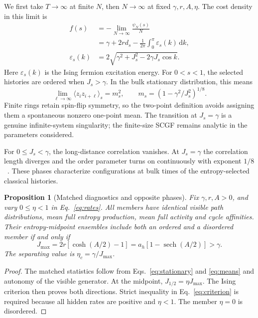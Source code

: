 \documentclass[aps,pre,reprint,amsmath,amssymb,longbibliography,floatfix]{revtex4-2}
\newtheorem{proposition}{Proposition}
\newcommand{\dd}{\,\mathrm d}
\begin{document}
We first take $T\to\infty$ at finite $N$, then $N\to\infty$ at fixed
$\gamma,r,A,\eta$. The cost density in this limit is
\begin{equation}
 \begin{split}
 f(s)&=-\lim_{N\to\infty}\frac{\psi_N(s)}N\\
 &=\gamma+2r d_s-\frac1{2\pi}\int_0^\pi\varepsilon_s(k)\dd k,\\
 \varepsilon_s(k)&=2\sqrt{\gamma^2+J_s^2-2\gamma J_s\cos k}.
 \end{split}
 \label{eq:freeenergy}
\end{equation}
Here $\varepsilon_s(k)$ is the Ising fermion excitation energy.
For $0<s<1$, the selected histories are ordered when $J_s>\gamma$.
In the bulk stationary distribution, this means
\begin{equation}
 \lim_{\ell\to\infty}\langle z_i z_{i+\ell}\rangle_s=m_s^2,
 \qquad m_s=(1-\gamma^2/J_s^2)^{1/8}.
 \label{eq:order}
\end{equation}
Finite rings  retain spin-flip symmetry, so the two-point definition
avoids assigning them a spontaneous nonzero one-point mean.
The transition at $J_s=\gamma$ is a genuine infinite-system singularity;
the finite-size SCGF remains analytic in the parameters considered.

For $0\le J_s<\gamma$, the long-distance correlation vanishes.
At $J_s=\gamma$ the correlation length diverges and the order parameter
turns on continuously with exponent $1/8$~\cite{CriticalPfeuty1970}.
These phases characterize configurations at bulk times of the
entropy-selected classical histories.

\begin{proposition}[Matched diagnostics and opposite phases]
\label{prop:matched}
Fix $\gamma,r,A>0$, and vary $0\leq\eta<1$ in Eq.~\eqref{eq:rates}.
All members have identical visible path distributions, mean full entropy
production, mean full activity and cycle affinities. Their entropy-midpoint
ensembles include both an ordered and a disordered member if and only if
\begin{equation}
 J_{\max}=2r\left[\cosh(A/2)-1\right]
          =a_h\left[1-\operatorname{sech}(A/2)\right]>\gamma.
 \label{eq:criterion}
\end{equation}
The separating value is $\eta_c=\gamma/J_{\max}$.
\end{proposition}
\begin{proof}
The matched statistics follow from Eqs.~\eqref{eq:stationary} and
\eqref{eq:means} and autonomy of the visible generator. At the midpoint,
$J_{1/2}=\eta J_{\max}$. The Ising criterion then proves both directions.
Strict inequality in Eq.~\eqref{eq:criterion} is required because all
hidden rates are positive and $\eta<1$. The member $\eta=0$ is disordered.
\end{proof}
\end{document}
